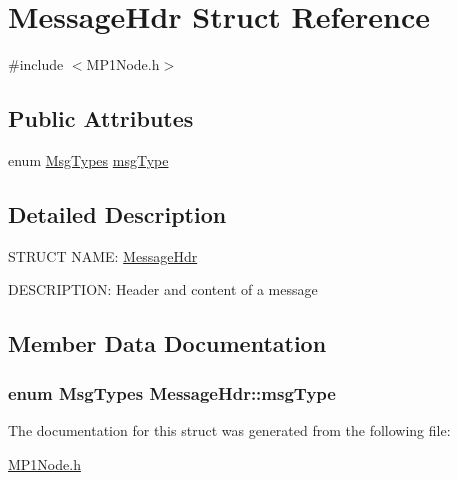 \hypertarget{struct_message_hdr}{\section{\-Message\-Hdr \-Struct \-Reference}
\label{d1/d4b/struct_message_hdr}
}


{\ttfamily \#include $<$\-M\-P1\-Node.\-h$>$}

\subsection*{\-Public \-Attributes}
\begin{DoxyCompactItemize}
\item 
enum \hyperlink{_m_p1_node_8h_aac5c14d7f394c4c17a10566926918dc0}{\-Msg\-Types} \hyperlink{struct_message_hdr_a3eb2c91aac9c66ccbd21eb7c1a3e0fc5}{msg\-Type}
\end{DoxyCompactItemize}


\subsection{\-Detailed \-Description}
\-S\-T\-R\-U\-C\-T \-N\-A\-M\-E\-: \hyperlink{struct_message_hdr}{\-Message\-Hdr}

\-D\-E\-S\-C\-R\-I\-P\-T\-I\-O\-N\-: \-Header and content of a message 

\subsection{\-Member \-Data \-Documentation}
\hypertarget{struct_message_hdr_a3eb2c91aac9c66ccbd21eb7c1a3e0fc5}{
\subsubsection[{msg\-Type}]{\setlength{\rightskip}{0pt plus 5cm}enum {\bf \-Msg\-Types} {\bf \-Message\-Hdr\-::msg\-Type}}}\label{d1/d4b/struct_message_hdr_a3eb2c91aac9c66ccbd21eb7c1a3e0fc5}


\-The documentation for this struct was generated from the following file\-:\begin{DoxyCompactItemize}
\item 
\hyperlink{_m_p1_node_8h}{\-M\-P1\-Node.\-h}\end{DoxyCompactItemize}

